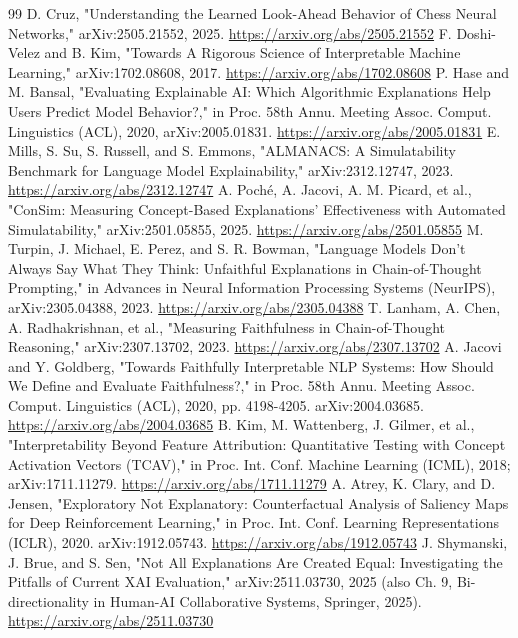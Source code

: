 \documentclass[conference]{IEEEtran}
\begin{document}
\begin{thebibliography}{99}
 D. Cruz, "Understanding the Learned Look-Ahead Behavior of Chess Neural Networks," arXiv:2505.21552, 2025. \url{https://arxiv.org/abs/2505.21552}
 F. Doshi-Velez and B. Kim, "Towards A Rigorous Science of Interpretable Machine Learning," arXiv:1702.08608, 2017. \url{https://arxiv.org/abs/1702.08608}
 P. Hase and M. Bansal, "Evaluating Explainable AI: Which Algorithmic Explanations Help Users Predict Model Behavior?," in Proc. 58th Annu. Meeting Assoc. Comput. Linguistics (ACL), 2020, arXiv:2005.01831. \url{https://arxiv.org/abs/2005.01831}
 E. Mills, S. Su, S. Russell, and S. Emmons, "ALMANACS: A Simulatability Benchmark for Language Model Explainability," arXiv:2312.12747, 2023. \url{https://arxiv.org/abs/2312.12747}
 A. Poché, A. Jacovi, A. M. Picard, et al., "ConSim: Measuring Concept-Based Explanations' Effectiveness with Automated Simulatability," arXiv:2501.05855, 2025. \url{https://arxiv.org/abs/2501.05855}
 M. Turpin, J. Michael, E. Perez, and S. R. Bowman, "Language Models Don't Always Say What They Think: Unfaithful Explanations in Chain-of-Thought Prompting," in Advances in Neural Information Processing Systems (NeurIPS), arXiv:2305.04388, 2023. \url{https://arxiv.org/abs/2305.04388}
 T. Lanham, A. Chen, A. Radhakrishnan, et al., "Measuring Faithfulness in Chain-of-Thought Reasoning," arXiv:2307.13702, 2023. \url{https://arxiv.org/abs/2307.13702}
 A. Jacovi and Y. Goldberg, "Towards Faithfully Interpretable NLP Systems: How Should We Define and Evaluate Faithfulness?," in Proc. 58th Annu. Meeting Assoc. Comput. Linguistics (ACL), 2020, pp. 4198-4205. arXiv:2004.03685. \url{https://arxiv.org/abs/2004.03685}
 B. Kim, M. Wattenberg, J. Gilmer, et al., "Interpretability Beyond Feature Attribution: Quantitative Testing with Concept Activation Vectors (TCAV)," in Proc. Int. Conf. Machine Learning (ICML), 2018; arXiv:1711.11279. \url{https://arxiv.org/abs/1711.11279}
 A. Atrey, K. Clary, and D. Jensen, "Exploratory Not Explanatory: Counterfactual Analysis of Saliency Maps for Deep Reinforcement Learning," in Proc. Int. Conf. Learning Representations (ICLR), 2020. arXiv:1912.05743. \url{https://arxiv.org/abs/1912.05743}
 J. Shymanski, J. Brue, and S. Sen, "Not All Explanations Are Created Equal: Investigating the Pitfalls of Current XAI Evaluation," arXiv:2511.03730, 2025 (also Ch. 9, Bi-directionality in Human-AI Collaborative Systems, Springer, 2025). \url{https://arxiv.org/abs/2511.03730}

\end{thebibliography}
\end{document}
